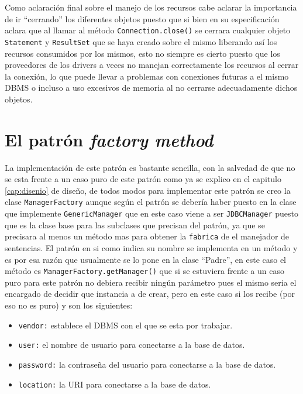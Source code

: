 Como aclaración final sobre el manejo de los recursos cabe aclarar la importancia de ir ``cerrando'' los diferentes objetos puesto que si bien \jd en su especificación aclara que al llamar al método \verb=Connection.close()= se cerrara cualquier objeto \verb=Statement= y \verb=ResultSet= que se haya creado sobre el mismo liberando así los recursos consumidos por los mismos, esto no siempre es cierto puesto que los proveedores de los drivers \jd a veces no manejan correctamente los recursos al cerrar la conexión, lo que puede llevar a problemas con conexiones futuras a el mismo DBMS o incluso a uso excesivos de memoria al no cerrarse adecuadamente dichos objetos.
%
\section{El patrón \textit{factory method}}
La implementación de este patrón es bastante sencilla, con la salvedad de que no se esta frente a un caso puro de este patrón como ya se explico en el capitulo \ref{cap:disenio} de diseño, de todos modos para implementar este patrón se creo la clase \verb=ManagerFactory= aunque según el patrón se debería haber puesto en la clase que implemente \verb=GenericManager= que en este caso viene a ser \verb=JDBCManager= puesto que es la clase base para las subclases que precisan del patrón, ya que se precisara al menos un método mas para obtener la \verb=fabrica= de el manejador de sentencias. El patrón en si como indica su nombre se implementa en un método y es por esa razón que usualmente se lo pone en la clase ``Padre'', en este caso el método es \verb=ManagerFactory.getManager()= que si se estuviera frente a un caso puro para este patrón no debiera recibir ningún parámetro pues el mismo seria el encargado de decidir que instancia a  de crear, pero en este caso si los recibe (por eso no es puro) y son los siguientes:
\begin{itemize}
\item \verb=vendor:= establece el DBMS con el que se esta por trabajar.
\item \verb=user:= el nombre de usuario para conectarse a la base de datos.
\item \verb=password:= la contraseña del usuario para conectarse a la base de datos.
\item \verb=location:= la URI para conectarse a la base de datos.
\end{itemize}
